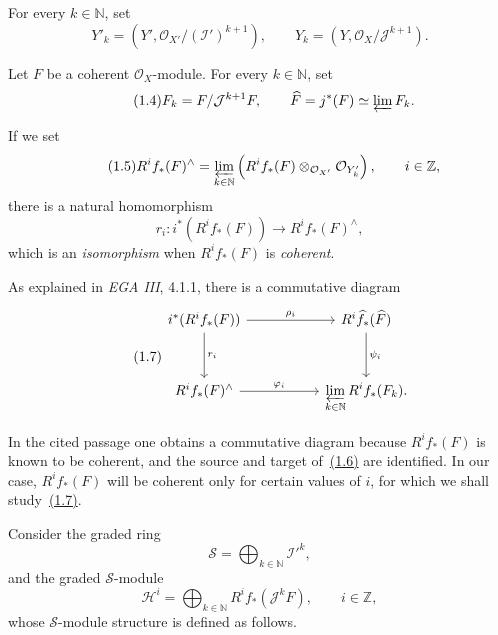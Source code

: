 For every $k\in\mathbb N$, set
\begin{equation}
\tag{1.3}\label{eq:IX.1.3}
Y'_k=\left(Y',\mathcal O_{X'}/(\mathcal I')^{k+1}\right),
\qquad
Y_k=\left(Y,\mathcal O_X/\mathcal J^{k+1}\right).
\end{equation}

Let $F$ be a coherent $\mathcal O_X$-module. For every $k\in\mathbb N$, set
\begin{equation}
\tag{1.4}\label{eq:IX.1.4}
F_k=F/\mathcal J^{k+1}F,
\qquad
\widehat F=j^*(F)\simeq\varprojlim F_k.
\end{equation}

If we set
\begin{equation}
\tag{1.5}\label{eq:IX.1.5}
R^i f_*(F)^{\wedge}
=\varprojlim_{k\in\mathbb N}
\left(R^i f_*(F)\otimes_{\mathcal O_{X'}}\mathcal O_{Y'_k}\right),
\qquad i\in\mathbb Z,
\end{equation}
there is a natural homomorphism
\begin{equation}
\tag{1.6}\label{eq:IX.1.6}
r_i:i^*(R^i f_*(F))\longrightarrow R^i f_*(F)^{\wedge},
\end{equation}
which is an \emph{isomorphism} when $R^i f_*(F)$ is \emph{coherent}.

As explained in \emph{EGA III}, 4.1.1, there is a commutative diagram
\begin{equation}
\tag{1.7}\label{eq:IX.1.7}
\begin{tikzcd}[column sep=5.2em,row sep=3.2em]
i^*(R^i f_*(F))
  \arrow[r,"\rho_i"]
  \arrow[d,"r_i"]
& R^i\widehat f_*(\widehat F)
  \arrow[d,"\psi_i"] \\
R^i f_*(F)^{\wedge}
  \arrow[r,"\varphi_i"]
& \displaystyle\varprojlim_{k\in\mathbb N} R^i f_*(F_k).
\end{tikzcd}
\end{equation}

In the cited passage one obtains a commutative diagram because
$R^i f_*(F)$ is known to be coherent, and the source and target of~\hyperref[eq:IX.1.6]{(1.6)}
are identified. In our case, $R^i f_*(F)$ will be coherent only for certain
values of $i$, for which we shall study~\hyperref[eq:IX.1.7]{(1.7)}.

Consider the graded ring
\begin{equation}
\tag{1.8}\label{eq:IX.1.8}
\mathcal S=\bigoplus_{k\in\mathbb N}{\mathcal I'}^k,
\end{equation}
and the graded $\mathcal S$-module
\begin{equation}
\tag{1.9}\label{eq:IX.1.9}
\mathcal H^i=\bigoplus_{k\in\mathbb N}R^i f_*(\mathcal J^kF),
\qquad i\in\mathbb Z,
\end{equation}
whose $\mathcal S$-module structure is defined as follows.

